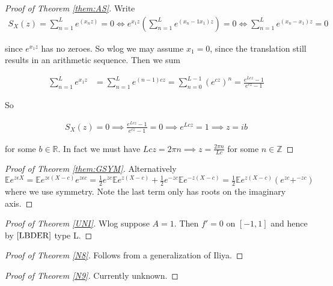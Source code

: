\documentclass[10pt]{article}
\newcommand{\E}{\mathbb{E}}
\newcommand{\1}{\textbf{1}}
\newcommand{\R}{\mathbb{R}}
\newcommand{\Z}{\mathbb{Z}}
\theoremstyle{remark}
\theoremstyle{definition}
\begin{document}
\begin{proof}[Proof of Theorem \ref{them:AS}]
 Write 
	\begin{align*}
		S_X(z) = \sum_{n=1}^L e^(x_n z) = 0 \iff e^{x_1z}(\sum_{n=1}^L e^{(x_n-1x_1)z}) = 0 \iff \sum_{n=1}^L e^{(x_n-x_1)z} = 0
	\end{align*}

	since $e^{x_1z}$ has no zeroes. So wlog we may assume $x_1 = 0$, since the translation still results in an arithmetic sequence. Then we sum

	\begin{align*}
		\sum_{n=1}^L e^{x_1 z} &= \sum_{n=1}^L e^{(n-1)cz} = \sum_{n=0}^{L-1}(e^{cz})^{n} = \frac{e^{Lcz}-1}{e^{cz}-1}
	\end{align*}

	So 

	\begin{align*}
		S_X(z) = 0 \implies \frac{e^{Lcz}-1}{e^{cz}-1} = 0 \implies e^{Lcz} = 1 \implies z = ib
	\end{align*}

	for some $b \in \R$. In fact we must have $Lcz = 2\pi n \implies z = \frac{2 \pi n}{L c}$ for some $n \in \Z$
\end{proof} 

\begin{proof}[Proof of Theorem \ref{them:GSYM}]

	Alternatively $\E e^{z \epsilon X} = \E e^{z\epsilon (X-c)}e^{z\epsilon c} = \frac{1}{2}e^{zc}\E e^{z(X-c)}+\frac{1}{2}e^{-zc}\E e^{-z(X-c)} = \frac{1}{2}\E e^{z(X-c)}(e^{zc}+^{-zc})$ where we use symmetry. Note the last term only has roots on the imaginary axis.
\end{proof}


\begin{proof}[Proof of Theorem \ref{UNI}]
	Wlog suppose $A = 1$. Then $f' = 0$ on $[-1,1]$ and hence by $\ref{LBDER}$ type L.
\end{proof}

\begin{proof}[Proof of Theorem \ref{N8}]
	Follows from a generalization of Iliya.
\end{proof}

\begin{proof}[Proof of Theorem \ref{N9}]
	Currently unknown.
\end{proof}
\end{document}
